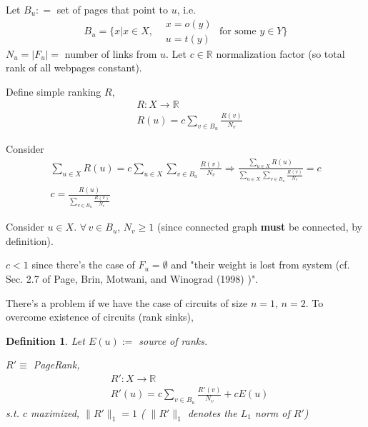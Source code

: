 \documentclass[10pt]{amsart}
\newtheorem{definition}{Definition}
\begin{document}
\begin{multicols*}{2}
Let $B_u : = $ set of pages that point to $u$, i.e. 
\begin{equation}
	B_u = \lbrace x | x\in X, \begin{aligned} & x = o(y) \\
	& u= t(y) \end{aligned} \text{ for some } y\in Y \rbrace 
\end{equation}
$N_u = |F_u| = $ number of links from $u$.  Let $c\in \mathbb{R}$ normalization factor (so total rank of all webpages constant).  

Define simple ranking $R$, 
\begin{equation}
\begin{aligned}
& R:X \to \mathbb{R}  \\
& R(u) = c\sum_{ v\in B_u } \frac{R(v) }{N_v}
\end{aligned}
\end{equation}

Consider 
\[
\begin{gathered}
\sum_{u \in X} R(u) = c\sum_{u \in X} \sum_{v\in B_u} \frac{R(v) }{ N_v} \Longrightarrow \frac{ \sum_{u\in X} R(u)}{ \sum_{u\in X} \sum_{ v\in B_u } \frac{R(v)}{N_v} } = c   \\
	c=\frac{R(u)}{ \sum_{v\in B_u } \frac{R(v) }{ N_v} }
\end{gathered}
\]

Consider $u \in X$.  $\forall \, v \in B_u$, $N_v \geq 1$ (since connected graph \textbf{must} be connected, by definition).  

$c<1$ since there's the case of $F_u = \emptyset$ and "their weight is lost from system (cf. Sec. 2.7 of Page, Brin, Motwani, and Winograd (1998) \cite{PBMW1998})".  

There's a problem if we have the case of circuits of size $n=1$, $n=2$.  To overcome existence of circuits (rank sinks), 
\begin{definition}
	Let $E(u) := $ source of ranks.  
	
	$R' \equiv $ PageRank, 
	\begin{equation}
	\begin{aligned}
	& R' : X\to \mathbb{R}  \\
	& R'(u) = c\sum_{v\in B_u } \frac{R'(v)}{N_v} + cE(u)
	\end{aligned}
	\end{equation}
s.t. $c$ maximized, $\| R' \|_1 = 1$ ( $\| R' \|_1$ denotes the $L_1$ norm of $R'$)	
\end{definition}


\end{multicols*}
\end{document}
